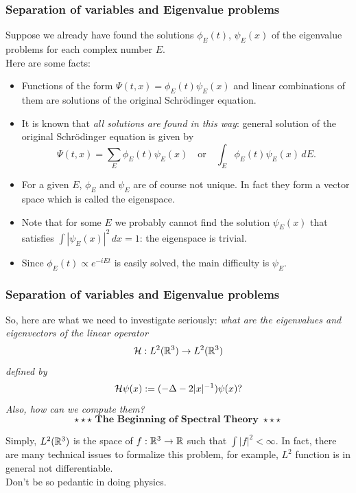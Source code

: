 \documentclass[10pt]{beamer}
\begin{document}
\begin{frame}
\frametitle{Separation of variables and Eigenvalue problems}
  Suppose we already have found the solutions $\phi_E(t)$, $\psi_E(x)$ of the eigenvalue problems for each complex number $E$.\\
  Here are some facts:
  \pause
  \begin{itemize}[<+->]
    \item Functions of the form $\Psi(t,x)=\phi_E(t)\psi_E(x)$ and linear combinations of them are solutions of the original Schr\"odinger equation.
    \item It is known that \emph{all solutions are found in this way}: general solution of the original Schr\"odinger equation is given by
    \[\Psi(t,x)=\sum_E\phi_E(t)\psi_E(x)\quad\text{or}\quad\int_E\phi_E(t)\psi_E(x)\,dE.\]
    \item For a given $E$, $\phi_E$ and $\psi_E$ are of course not unique. In fact they form a vector space which is called the eigenspace.
    \item Note that for some $E$ we probably cannot find the solution $\psi_E(x)$ that satisfies $\int|\psi_E(x)|^2\,dx=1$: the eigenspace is trivial.
    \item Since $\phi_E(t)\propto e^{-iEt}$ is easily solved, the main difficulty is $\psi_E$.
  \end{itemize}
\end{frame}

\begin{frame}
\frametitle{Separation of variables and Eigenvalue problems}
  So, here are what we need to investigate seriously:
  \pause\emph{what are the eigenvalues and eigenvectors of the linear operator}
  \[\cH:L^2(\R^3)\to L^2(\R^3)\]
  \emph{defined by}
  \[\mathcal{H}\psi(x):=(-\Delta-2|x|^{-1})\psi(x)?\]
  \emph{Also, how can we compute them?}
  \pause \[\star\star\star\textbf{ The Beginning of Spectral Theory }\star\star\star\]
  \pause \vspace{-2em}
  \begin{rmk}
    Simply, $L^2(\mathbb{R}^3)$ is the space of $f:\R^3\to\R$ such that $\int|f|^2<\infty$. In fact, there are many technical issues to formalize this problem, for example, $L^2$ function is in general not differentiable.\\
    \pause Don't be so pedantic in doing physics.
  \end{rmk}
\end{frame}
\end{document}
